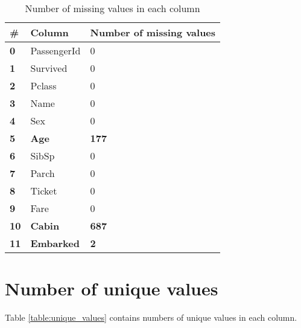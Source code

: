 \begin{table}[!ht]
	\centering
	\caption{Number of missing values in each column}
	\begin{tabular}{|l|l|l|}
		\hline
		\textbf{\#} & \textbf{Column}   & \textbf{Number of missing values} \\ \hline
		\textbf{0}  & PassengerId       & 0                                 \\ \hline
		\textbf{1}  & Survived          & 0                                 \\ \hline
		\textbf{2}  & Pclass            & 0                                 \\ \hline
		\textbf{3}  & Name              & 0                                 \\ \hline
		\textbf{4}  & Sex               & 0                                 \\ \hline
		\textbf{5}  & \textbf{Age}      & \textbf{177}                      \\ \hline
		\textbf{6}  & SibSp             & 0                                 \\ \hline
		\textbf{7}  & Parch             & 0                                 \\ \hline
		\textbf{8}  & Ticket            & 0                                 \\ \hline
		\textbf{9}  & Fare              & 0                                 \\ \hline
		\textbf{10} & \textbf{Cabin}    & \textbf{687}                      \\ \hline
		\textbf{11} & \textbf{Embarked} & \textbf{2}                        \\ \hline
	\end{tabular}
	\label{table:missing_values}
\end{table}


\pagebreak
\section{Number of unique values}
Table \ref{table:unique_values} contains numbers of unique values in 
each column.

